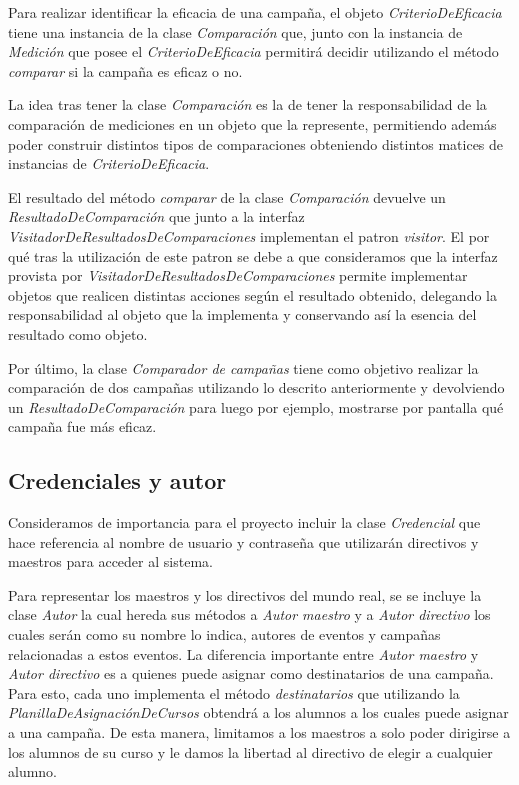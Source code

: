 \documentclass[a4paper, 10pt, twoside]{article}
\begin{document}
Para realizar identificar la eficacia de una campaña, el objeto \textit{CriterioDeEficacia} tiene una instancia de la 
clase \textit{Comparación} que, junto con la instancia de \textit{Medición} que posee el \textit{CriterioDeEficacia} 
permitirá decidir utilizando el método \textit{comparar} si la campaña es eficaz o no.

La idea tras tener la clase \textit{Comparación} es la de tener la responsabilidad de la comparación de mediciones 
en un objeto que la represente, permitiendo además poder construir distintos tipos de comparaciones obteniendo distintos 
matices de instancias de \textit{CriterioDeEficacia}.

El resultado del método \textit{comparar} de la clase \textit{Comparación} devuelve un \textit{ResultadoDeComparación} 
que junto a la interfaz \textit{VisitadorDeResultadosDeComparaciones} implementan el patron \textit{visitor}. El por qué 
tras la utilización de este patron se debe a que consideramos que la interfaz provista por 
\textit{VisitadorDeResultadosDeComparaciones} permite implementar objetos que realicen distintas acciones según el 
resultado obtenido, delegando la responsabilidad al objeto que la implementa y conservando así la esencia del resultado 
como objeto.

Por último, la clase \textit{Comparador de campañas} tiene como objetivo realizar la comparación de dos campañas utilizando 
lo descrito anteriormente y devolviendo un \textit{ResultadoDeComparación} para luego por ejemplo, 
mostrarse por pantalla qué campaña fue más eficaz.

\subsection{Credenciales y autor}
Consideramos de importancia para el proyecto incluir la clase \textit{Credencial} que hace referencia al nombre de usuario y 
contraseña que utilizarán directivos y maestros para acceder al sistema.

Para representar los maestros y los directivos del mundo real, se se incluye la clase \textit{Autor} la cual hereda 
sus métodos a \textit{Autor maestro} y a \textit{Autor directivo} los cuales serán como su nombre lo indica, autores 
de eventos y campañas relacionadas a estos eventos. La diferencia importante entre \textit{Autor maestro} y 
\textit{Autor directivo} es a quienes puede asignar como destinatarios de una campaña. Para esto, cada uno implementa 
el método \textit{destinatarios} que utilizando la \textit{PlanillaDeAsignaciónDeCursos} obtendrá a los alumnos 
a los cuales puede asignar a una campaña. De esta manera, limitamos a los maestros a solo poder dirigirse a los alumnos 
de su curso y le damos la libertad al directivo de elegir a cualquier alumno.
\end{document}
